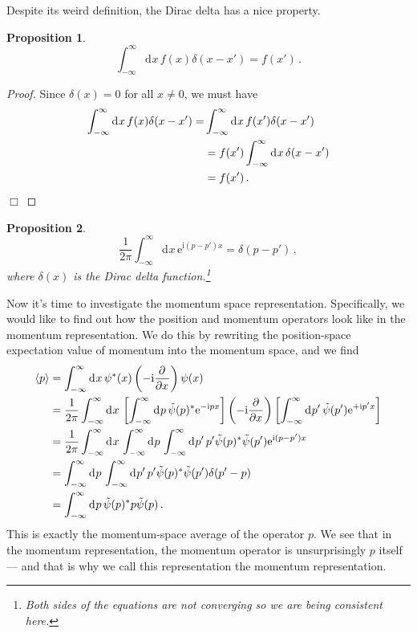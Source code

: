 \documentclass{article}
\theoremstyle{plain}\theoremheaderfont{\normalfont\itshape}\theorembodyfont{\rmfamily}\theoremseparator{.}\newtheorem*{rem}{Remark}\newtheorem*{ex}{Example}\newtheorem*{proof}{Proof}\newtheorem*{altp}{Alternative proof}
\theoremstyle{plain}\theoremheaderfont{\normalfont\bfseries}\theorembodyfont{\rmfamily}\theoremseparator{.}\newtheorem{thm}{Theorem}[section]\newtheorem{lem}[thm]{Lemma}\newtheorem{prop}[thm]{Proposition}\newtheorem*{cor}{Corollary}\newtheorem{defn}[thm]{Definition}\newtheorem{clm}[thm]{Claim}\newtheorem{clminproof}{Claim}
\theoremstyle{break}\theoremheaderfont{\normalfont\itshape}\theorembodyfont{\rmfamily}\theoremseparator{.\medskip}\newtheorem*{proofskip}{Proof}\newtheorem*{exs}{Examples}\newtheorem*{rems}{Remarks}
\theoremstyle{break}\theoremheaderfont{\normalfont\bfseries}\theorembodyfont{\rmfamily}\theoremseparator{.\medskip}\newtheorem{lemskip}[thm]{Lemma}\newtheorem{defnskip}[thm]{Definition}\newtheorem{propskip}[thm]{Proposition}\newtheorem{thmskip}[thm]{Theorem}
\numberwithin{equation}{section}
\newcommand{\qed}{\hfill\ensuremath{\Box}}
\newcommand{\ii}{\mathrm{i}}
\newcommand{\ee}{\mathrm{e}}
\newcommand{\dd}[2][]{\mathrm{d}^{#1} #2\,}
\newcommand{\pdv}[3][]{\frac{\partial^{#1} #2}{{\partial #3}^{#1}}}
\newcommand{\eval}[1]{\left\langle #1 \right\rangle}
\begin{document}
    Despite its weird definition, the Dirac delta has a nice property.
    \begin{prop}
        \begin{equation}
        \int_{-\infty}^{\infty}\dd{x}f(x)\delta(x-x')=f(x')\,.
        \end{equation}
    \end{prop}
    \begin{proof}
        Since \(\delta(x)=0\) for all \(x\ne 0\), we must have
        \begin{align}
            \int_{-\infty}^{\infty}\dd{x}f(x)\delta(x-x')=&\int_{-\infty}^{\infty}\dd{x}f(x')\delta(x-x')\notag\\
            &=f(x')\int_{-\infty}^{\infty}\dd{x}\delta(x-x')\notag\\
            &=f(x')\,.
        \end{align}
        \qed
    \end{proof}
    \begin{prop}
        \begin{equation}
            \frac{1}{2\pi}\int_{-\infty}^{\infty}\dd{x}\ee^{\ii(p-p')x}=\delta(p-p')\,,
        \end{equation}
        where \(\delta(x)\) is the \textit{Dirac delta function}.\footnote{Both sides of the equations are not converging so we are being consistent here.}
    \end{prop}

    Now it's time to investigate the momentum space representation. Specifically, we would like to find out how the position and momentum operators look like in the momentum representation. We do this by rewriting the position-space expectation value of momentum into the momentum space, and we find
    \begin{align}
        \eval{p}&=\int_{-\infty}^{\infty}\dd{x}\psi^*(x)\left(-\ii\pdv{}{x}\right)\psi(x)\notag\\
        &=\frac{1}{2\pi}\int_{-\infty}^{\infty}\dd{x}\left[\int_{-\infty}^{\infty}\dd{p}\tilde{\psi}(p)^* \ee^{-\ii px}\right]\left(-\ii\pdv{}{x}\right)\left[\int_{-\infty}^{\infty}\dd{p'}\tilde{\psi}(p') \ee^{+\ii p'x}\right]\notag\\
        &=\frac{1}{2\pi}\int_{-\infty}^{\infty}\dd{x}\int_{-\infty}^{\infty}\dd{p}\int_{-\infty}^{\infty}\dd{p'}p'\tilde{\psi}(p)^*\tilde{\psi}(p')\ee^{\ii(p-p')x}\notag\\
        &=\int_{-\infty}^{\infty}\dd{p}\int_{-\infty}^{\infty}\dd{p'}p'\tilde{\psi}(p)^*\tilde{\psi}(p')\delta(p'-p)\notag\\
        &=\int_{-\infty}^{\infty}\dd{p}\tilde{\psi}(p)^* p \tilde{\psi}(p)\,.
    \end{align}
    This is exactly the momentum-space average of the operator \(p\). We see that in the momentum representation, the momentum operator is unsurprisingly \(p\) itself --- and that is why we call this representation the momentum representation.
\end{document}
